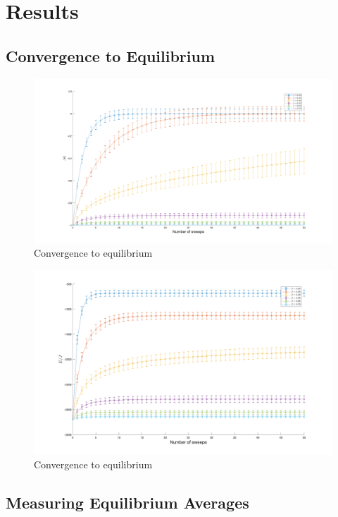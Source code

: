 \documentclass[11pt]{iopart}
\begin{document}
\section{Results}

\subsection{Convergence to Equilibrium}

\begin{figure}[t]
  \centering
  \includegraphics[width=\linewidth]{images/section1/magnetisation.png}
  \caption{Convergence to equilibrium}
  \label{fig:magnetisationsection1}
\end{figure}

\begin{figure}[t]
  \centering
  \includegraphics[width=\linewidth]{images/section1/energy.png}
  \caption{Convergence to equilibrium}
  \label{fig:energysection1}
\end{figure}

\subsection{Measuring Equilibrium Averages}
\end{document}
